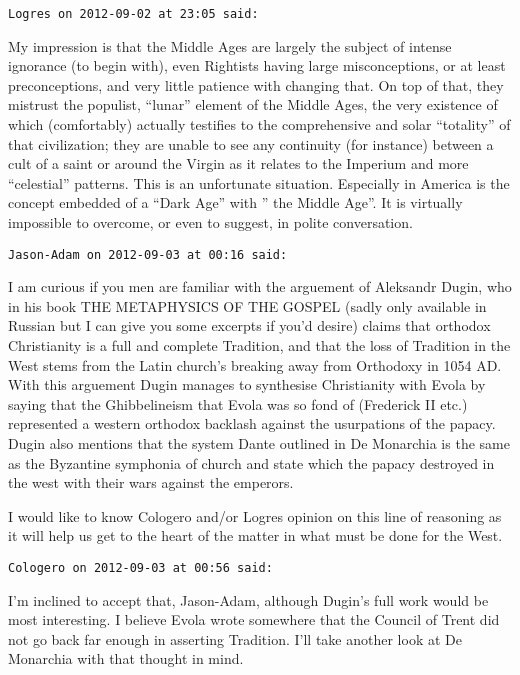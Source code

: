 \begin{footnotesize}\begin{sffamily}
\texttt{Logres on 2012-09-02 at 23:05 said:}

My impression is that the Middle Ages are largely the subject of intense ignorance (to begin with), even Rightists having large misconceptions, or at least preconceptions, and very little patience with changing that. On top of that, they mistrust the populist, “lunar” element of the Middle Ages, the very existence of which (comfortably) actually testifies to the comprehensive and solar “totality” of that civilization; they are unable to see any continuity (for instance) between a cult of a saint or around the Virgin as it relates to the Imperium and more “celestial” patterns. This is an unfortunate situation. Especially in America is the concept embedded of a “Dark Age” with ” the Middle Age”. It is virtually impossible to overcome, or even to suggest, in polite conversation.


\hfill

\texttt{Jason-Adam on 2012-09-03 at 00:16 said:}

I am curious if you men are familiar with the arguement of Aleksandr Dugin, who in his book THE METAPHYSICS OF THE GOSPEL (sadly only available in Russian but I can give you some excerpts if you'd desire) claims that orthodox Christianity is a full and complete Tradition, and that the loss of Tradition in the West stems from the Latin church's breaking away from Orthodoxy in 1054 AD. With this arguement Dugin manages to synthesise Christianity with Evola by saying that the Ghibbelineism that Evola was so fond of (Frederick II etc.) represented a western orthodox backlash against the usurpations of the papacy. Dugin also mentions that the system Dante outlined in De Monarchia is the same as the Byzantine symphonia of church and state which the papacy destroyed in the west with their wars against the emperors.

I would like to know Cologero and/or Logres opinion on this line of reasoning as it will help us get to the heart of the matter in what must be done for the West.


\hfill

\texttt{Cologero on 2012-09-03 at 00:56 said:}

I'm inclined to accept that, Jason-Adam, although Dugin's full work would be most interesting. I believe Evola wrote somewhere that the Council of Trent did not go back far enough in asserting Tradition. I'll take another look at De Monarchia with that thought in mind.



\end{sffamily}
\end{footnotesize}

